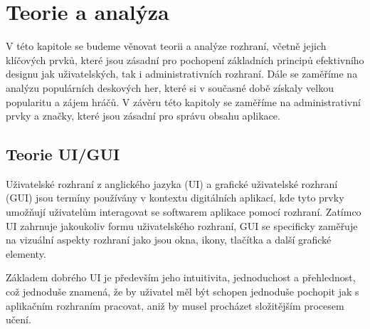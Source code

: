 \chapter{Teorie a analýza}
\label{ch:theory_and_analysis}
V této kapitole se budeme věnovat teorii a analýze rozhraní, včetně jejich klíčových prvků, které jsou zásadní pro pochopení základních principů efektivního designu jak uživatelských, tak i administrativních rozhraní. Dále se zaměříme na analýzu populárních deskových her, které si v současné době získaly velkou popularitu a zájem hráčů. V závěru této kapitoly se zaměříme na administrativní prvky a značky, které jsou zásadní pro správu obsahu aplikace.

\section{Teorie UI/GUI}
\label{sec:ui-gui-theory}
Uživatelské rozhraní z anglického jazyka \textit{} (UI) a grafické uživatelské rozhraní \textit{} (GUI) jsou termíny používány v kontextu digitálních aplikací, kde tyto prvky umožňují uživatelům interagovat se softwarem aplikace pomocí rozhraní. Zatímco UI zahrnuje jakoukoliv formu uživatelského rozhraní, GUI se specificky zaměřuje na vizuální aspekty rozhraní jako jsou okna, ikony, tlačítka a další grafické elementy.

Základem dobrého UI je především jeho intuitivita, jednoduchost a přehlednost, což jednoduše znamená, že by uživatel měl být schopen jednoduše pochopit jak s aplikačním rozhraním pracovat, aniž by musel procházet složitějším procesem učení.

